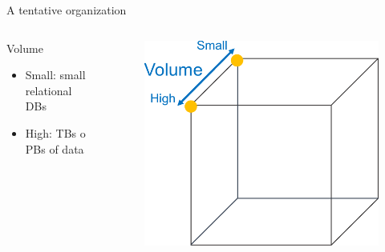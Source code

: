 \begin{frame}[allowframebreaks]{A tentative organization}
\framebreak

\begin{columns}
\begin{column}{0.5\textwidth}
Volume
\begin{itemize}
\item Small: small relational DBs
\item High: TBs o PBs of data
\end{itemize}
\end{column}
\begin{column}{0.5\textwidth}
\begin{figure}
\centering
\includegraphics[scale=.4]{imgs/bigdatacube1.pdf}
\end{figure}
\end{column}
\end{columns}

\framebreak


\end{frame}
